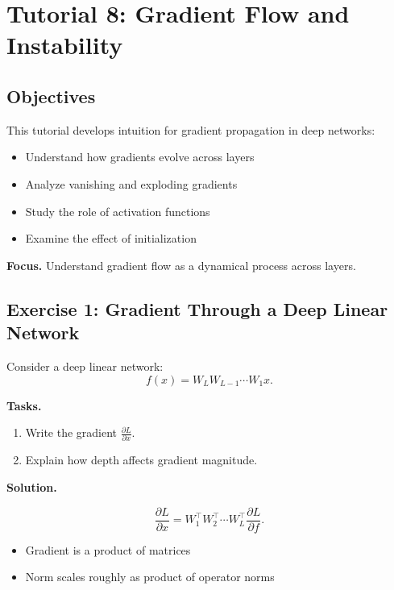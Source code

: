 \section{Tutorial 8: Gradient Flow and Instability}

\subsection{Objectives}

This tutorial develops intuition for gradient propagation in deep networks:

\begin{itemize}
    \item Understand how gradients evolve across layers
    \item Analyze vanishing and exploding gradients
    \item Study the role of activation functions
    \item Examine the effect of initialization
\end{itemize}

\medskip

\noindent
\textbf{Focus.}  
Understand gradient flow as a dynamical process across layers.

\subsection{Exercise 1: Gradient Through a Deep Linear Network}

Consider a deep linear network:
\[
f(x) = W_L W_{L-1} \cdots W_1 x.
\]

\medskip

\noindent
\textbf{Tasks.}
\begin{enumerate}
    \item Write the gradient $\frac{\partial L}{\partial x}$.
    \item Explain how depth affects gradient magnitude.
\end{enumerate}

\medskip

\noindent
\textbf{Solution.}

\[
\frac{\partial L}{\partial x}
= W_1^\top W_2^\top \cdots W_L^\top \frac{\partial L}{\partial f}.
\]

\medskip

\noindent
\begin{itemize}
    \item Gradient is a product of matrices
    \item Norm scales roughly as product of operator norms
\end{itemize}

